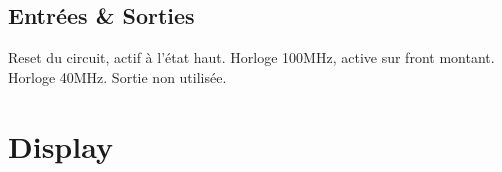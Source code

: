 \documentclass[french]{nakrule}
\begin{document}
\subsection{Entrées \& Sorties}
\label{subsec:Entrées_Sorties_dmc}

\begin{descr}
   Reset du circuit, actif à l'état haut.
   Horloge 100MHz, active sur front montant.
   Horloge 40MHz.
   Sortie non utilisée.
\end{descr}

\clearpage

\section{Display}
\label{sec:display}
\end{document}
